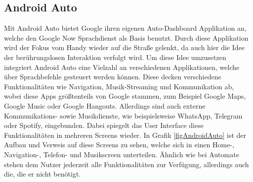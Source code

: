 \subsection{Android Auto}
Mit Android Auto bietet Google ihren eigenen Auto-Dashboard Applikation an, welche den Google Now Sprachdienst als Basis benutzt. Durch diese Applikation wird der Fokus vom Handy wieder auf die Straße gelenkt, da auch hier die Idee der berührungslosen Interaktion verfolgt wird.
Um diese Idee umzusetzen integriert Android Auto eine Vielzahl an verschiedenen Applikationen, welche über Sprachbefehle gesteuert werden können. Diese decken verschiedene Funktionalitäten wie Navigation, Musik-Streaming und Kommunikation ab, wobei diese Apps größtenteils von Google stammen, zum Beispiel Google Maps, Google Music oder Google Hangouts. Allerdings sind auch externe Kommunikations- sowie Musikdienste, wie beispielsweise WhatsApp, Telegram oder Spotify, eingebunden. 
Dabei spiegelt das User Interface diese Funktionalitäten in mehreren Screens wieder. In Grafik \ref{figAndroidAuto} ist der Aufbau und Verweis auf diese Screens zu sehen, welche sich in einen Home-, Navigation-, Telefon- und Musikscreen unterteilen. Ähnlich wie bei Automate stehen dem Nutzer jederzeit alle Funktionalitäten zur Verfügung, allerdings auch die, die er nicht benötigt.      
